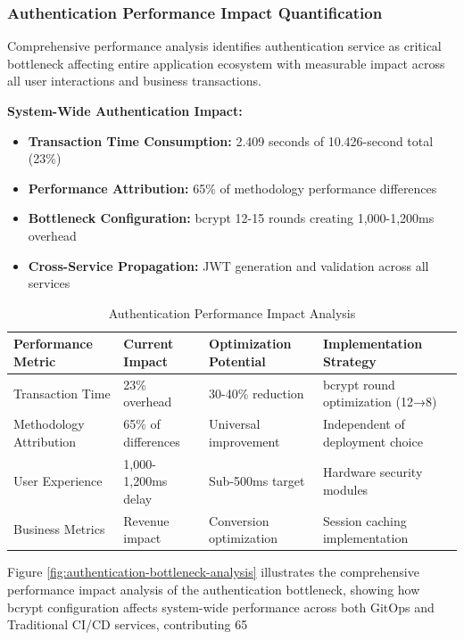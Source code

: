 \subsubsection{Authentication Performance Impact Quantification}

Comprehensive performance analysis identifies authentication service as critical bottleneck affecting entire application ecosystem with measurable impact across all user interactions and business transactions.

\textbf{System-Wide Authentication Impact:}
\begin{itemize}
\item \textbf{Transaction Time Consumption:} 2.409 seconds of 10.426-second total (23\%)
\item \textbf{Performance Attribution:} 65\% of methodology performance differences
\item \textbf{Bottleneck Configuration:} bcrypt 12-15 rounds creating 1,000-1,200ms overhead
\item \textbf{Cross-Service Propagation:} JWT generation and validation across all services
\end{itemize}

\begin{table}[H]
\centering
\caption{Authentication Performance Impact Analysis}
\label{tab:authentication_impact}
\begin{tabular}{|p{3.5cm}|p{2.5cm}|p{3cm}|p{4.5cm}|}
\hline
\textbf{Performance Metric} & \textbf{Current Impact} & \textbf{Optimization Potential} & \textbf{Implementation Strategy} \\
\hline
Transaction Time & 23\% overhead & 30-40\% reduction & bcrypt round optimization (12→8) \\
\hline
Methodology Attribution & 65\% of differences & Universal improvement & Independent of deployment choice \\
\hline
User Experience & 1,000-1,200ms delay & Sub-500ms target & Hardware security modules \\
\hline
Business Metrics & Revenue impact & Conversion optimization & Session caching implementation \\
\hline
\end{tabular}
\end{table}

Figure \ref{fig:authentication-bottleneck-analysis} illustrates the comprehensive performance impact analysis of the authentication bottleneck, showing how bcrypt configuration affects system-wide performance across both GitOps and Traditional CI/CD services, contributing 65%


